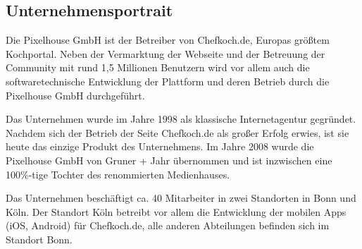 \subsection{Unternehmensportrait}

Die Pixelhouse GmbH ist der Betreiber von Chefkoch.de, Europas größtem Kochportal. Neben der Vermarktung der Webseite und der Betreuung der Community mit rund 1,5 Millionen Benutzern wird vor allem auch die softwaretechnische Entwicklung der Plattform und deren Betrieb durch die Pixelhouse GmbH durchgeführt.

Das Unternehmen wurde im Jahre 1998 als klassische Internetagentur gegründet. Nachdem sich der Betrieb der Seite Chefkoch.de als großer Erfolg erwies, ist sie heute das einzige Produkt des Unternehmens. Im Jahre 2008 wurde die Pixelhouse GmbH von Gruner + Jahr übernommen und ist inzwischen eine 100\%-tige Tochter des renommierten Medienhauses.

Das Unternehmen beschäftigt ca. 40 Mitarbeiter in zwei Standorten in Bonn und Köln. Der Standort Köln betreibt vor allem die Entwicklung der mobilen Apps (iOS, Android) für Chefkoch.de, alle anderen Abteilungen befinden sich im Standort Bonn.
